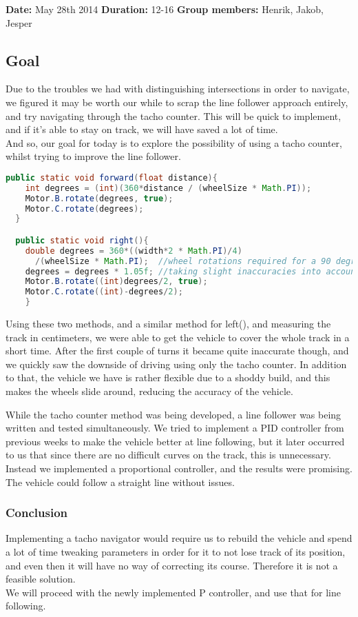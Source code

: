 \textbf{Date:} May 28th 2014
\textbf{Duration:} 12-16
\textbf{Group members:} Henrik, Jakob, Jesper

\subsection{Goal}
Due to the troubles we had with distinguishing intersections in order to
navigate, we figured it may be worth our while to scrap the line
follower approach entirely, and try navigating through the tacho
counter. This will be quick to implement, and if it's able to stay on
track, we will have saved a lot of time.\\And so, our goal for today is
to explore the possibility of using a tacho counter, whilst trying to
improve the line follower.

\begin{lstlisting}[language=java]
  public static void forward(float distance){ 
    int degrees = (int)(360*distance / (wheelSize * Math.PI));
    Motor.B.rotate(degrees, true);
    Motor.C.rotate(degrees);
  }

  public static void right(){
    double degrees = 360*((width*2 * Math.PI)/4)
      /(wheelSize * Math.PI);  //wheel rotations required for a 90 degree turn of the vehicle
    degrees = degrees * 1.05f; //taking slight inaccuracies into account
    Motor.B.rotate((int)degrees/2, true);
    Motor.C.rotate((int)-degrees/2);
    }
\end{lstlisting}
Using these two methods, and a similar method for left(), and measuring
the track in centimeters, we were able to get the vehicle to cover the
whole track in a short time. After the first couple of turns it became
quite inaccurate though, and we quickly saw the downside of driving
using only the tacho counter. In addition to that, the vehicle we have
is rather flexible due to a shoddy build, and this makes the wheels
slide around, reducing the accuracy of the vehicle.

While the tacho counter method was being developed, a line follower was
being written and tested simultaneously. We tried to implement a PID
controller from previous weeks to make the vehicle better at line
following, but it later occurred to us that since there are no difficult
curves on the track, this is unnecessary. Instead we implemented a
proportional controller, and the results were promising. The vehicle
could follow a straight line without issues.

\subsubsection{Conclusion}

Implementing a tacho navigator would require us to rebuild the vehicle
and spend a lot of time tweaking parameters in order for it to not lose
track of its position, and even then it will have no way of correcting
its course. Therefore it is not a feasible solution.\\We will proceed
with the newly implemented P controller, and use that for line
following.
